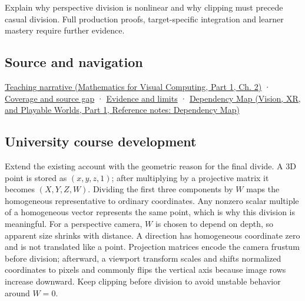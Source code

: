 \hypertarget{appendix-cb3b26862282-recall-and-next-depth}{}

Explain why perspective division is nonlinear and why clipping must precede casual division. Full production proofs, target-specific integration and learner mastery require further evidence.

\subsection{Source and navigation}\label{appendix-cb3b26862282-source-and-navigation}

\hypertarget{appendix-cb3b26862282-source-and-navigation}{}

\href{../02-Mathematics-for-Visual-Computing-P01/main.pdf\#01-foundations-i-ch018-homogeneous-coordinates-preserve-the-role-of-a-location}{Teaching narrative (Mathematics for Visual Computing, Part 1, Ch. 2)} · \hyperref[appendix-fd090d982a15-phase-6---parts-501-600]{Coverage and source gap} · \hyperref[appendix-a103e7846d21-phase-6---source-analysis-and-verification]{Evidence and limits} · \href{../07-Vision-XR-and-Playable-Worlds-P01/main.pdf\#appendix-4ad47bdd269a}{Dependency Map (Vision, XR, and Playable Worlds, Part 1, Reference notes: Dependency Map)}

\subsection{University course development}\label{appendix-cb3b26862282-university-course-development}

\hypertarget{appendix-cb3b26862282-university-course-development}{}

Extend the existing account with the geometric reason for the final divide. A 3D point is stored as \((x,y,z,1)\); after multiplying by a projective matrix it becomes \((X,Y,Z,W)\). Dividing the first three components by \(W\) maps the homogeneous representative to ordinary coordinates. Any nonzero scalar multiple of a homogeneous vector represents the same point, which is why this division is meaningful. For a perspective camera, \(W\) is chosen to depend on depth, so apparent size shrinks with distance. A direction has homogeneous coordinate zero and is not translated like a point. Projection matrices encode the camera frustum before division; afterward, a viewport transform scales and shifts normalized coordinates to pixels and commonly flips the vertical axis because image rows increase downward. Keep clipping before division to avoid unstable behavior around \(W=0\).

